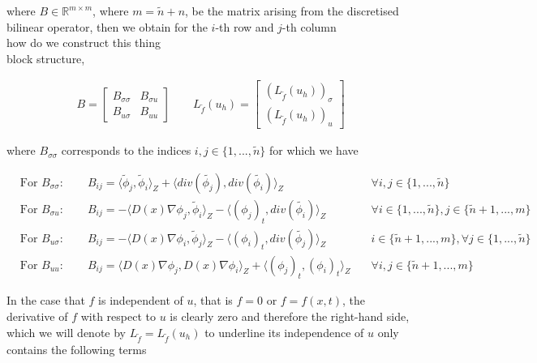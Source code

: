 \documentclass[../draft_1.tex]{subfiles}
\begin{document}
where $B \in \mathbb{R}^{m \times m}$, where $ m = \tilde{n} + n$, be the matrix arising from the discretised bilinear operator, then we obtain for the $i$-th row and $j$-th column \\
how do we construct this thing \\
block structure, 

\begin{ceqn}
	\begin{align}
B = \begin{bmatrix}
B_{\sigma \sigma} & B_{\sigma u} \\
B_{u \sigma}  & B_{uu} 
\end{bmatrix}
\qquad
 L_{\tilde{f}}(u_h) = \begin{bmatrix}
(L_{\tilde{f}}(u_h))_{\sigma} \\
(L_{\tilde{f}}(u_h))_u
 \end{bmatrix}
	\end{align}
\end{ceqn}
where $B_{\sigma \sigma}$ corresponds to the indices $i,j \in \{1, ..., \tilde{n}\}$ for which we have
\begin{ceqn}
	\begin{align}
&\text{For } B_{\sigma \sigma} :	\qquad B_{ij} = \langle \tilde{\phi}_j, \tilde{\phi}_i \rangle_Z + \langle div(\tilde{\phi_j}), div(\tilde{\phi_i}) \rangle_Z \quad &\forall i,j \in \{1, ..., \tilde{n}\} \\
&\text{For } B_{\sigma u} : \qquad B_{ij} = - \langle D(x) \nabla \phi_j, \tilde{\phi}_i \rangle_Z - \langle (\phi_j)_t, div(\tilde{\phi_i}) \rangle_Z \quad &\forall i \in \{1, ..., \tilde{n}\}, j \in \{\tilde{n}+1, ..., m\} \\
&\text{For } B_{u \sigma} : \qquad B_{ij} = - \langle D(x) \nabla \phi_i, \tilde{\phi}_j \rangle_Z - \langle (\phi_i)_t, div(\tilde{\phi_j}) \rangle_Z \quad &i \in \{\tilde{n}+1, ..., m\}, \forall j \in \{1, ..., \tilde{n}\}\\
&\text{For } B_{uu} : \qquad B_{ij} = \langle D(x) \nabla \phi_j, D(x) \nabla \phi_i \rangle_Z + \langle (\phi_j)_t, (\phi_i)_t \rangle_Z \quad &\forall i,j \in \{\tilde{n}+1, ..., m\}
\end{align}
\end{ceqn}
In the case that $f$ is independent of $u$, that is $f = 0$ or $f = f(x,t)$, the derivative of $f$ with respect to $u$ is clearly zero and therefore the right-hand side, which we will denote by $L_{\tilde{f}} = L_{\tilde{f}}(u_h)$ to underline its independence of $u$ only contains the following terms
\end{document}
